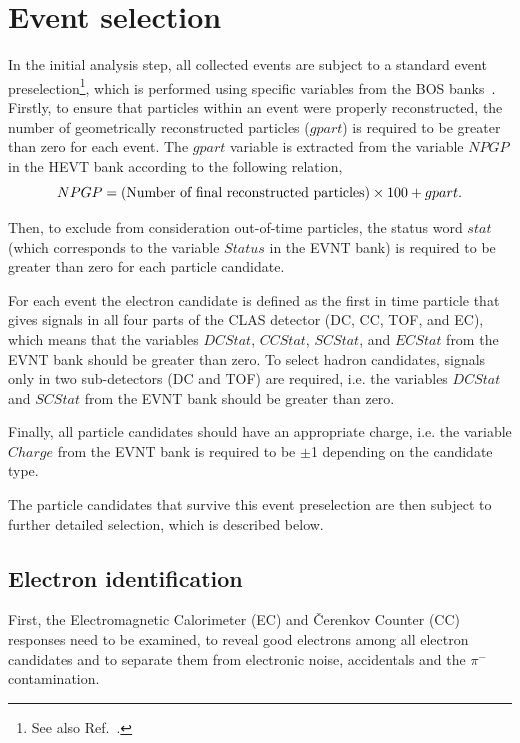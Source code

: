 \chapter{Event selection}
\label{Sect:select}


In the initial analysis step, all collected events are subject to a standard event preselection\footnote[1]{See also Ref.~\cite{my_an_note:2020}.}, which is performed using specific variables from the BOS banks~\cite{BOS:bank,Stepanyan:1999}. Firstly, to ensure that particles within an event were properly reconstructed, the number of geometrically reconstructed particles ($gpart$) is required to be greater than zero for each event. The $gpart$ variable is extracted from the variable $NPGP$ in the HEVT bank according to the following relation,\vspace{-0.75em}
\begin{equation}
NPGP=(\text{Number of final reconstructed particles})\times100 + gpart\\[-10pt].
\end{equation}

Then, to exclude from consideration out-of-time particles, the status word $stat$ (which corresponds to the variable $Status$ in the EVNT bank) is required to be greater than zero for each particle candidate.

For each event the electron candidate is defined as the first in time particle that gives signals in all four parts of the CLAS detector (DC, CC, TOF, and EC), which means that the variables $DCStat$, $CCStat$, $SCStat$, and $ECStat$ from the EVNT bank should be greater than zero. To select hadron candidates, signals only in two sub-detectors (DC and TOF) are required, i.e. the variables $DCStat$ and $SCStat$ from the EVNT bank should be greater than zero.


Finally, all particle candidates should have an appropriate charge, i.e. the variable $Charge$ from the EVNT bank is required to be $\pm$1 depending on the candidate type.


The particle candidates that survive this event preselection are then subject to further detailed selection, which is described below.



\section{Electron identification}
\label{Sect:el_id} 
First, the Electromagnetic Calorimeter (EC) and \v Cerenkov Counter (CC) responses need to be examined, to reveal good electrons among all electron candidates and to separate them from electronic noise, accidentals and the $\pi^{-}$ contamination.

